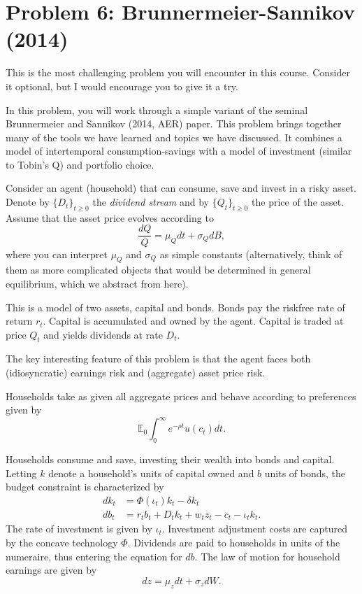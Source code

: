 \documentclass[11pt]{extarticle}
\theoremstyle{plain}
\theoremstyle{definition}
\begin{document}
\vspace{5mm}
\section*{Problem 6: Brunnermeier-Sannikov (2014)}


This is the most challenging problem you will encounter in this course. Consider it optional, but I would encourage you to give it a try. 


In this problem, you will work through a simple variant of the seminal Brunnermeier and Sannikov (2014, AER) paper. This problem brings together many of the tools we have learned and topics we have discussed. It combines a model of intertemporal consumption-savings with a model of investment (similar to Tobin's Q) and portfolio choice.


Consider an agent (household) that can consume, save and invest in a risky asset. Denote by $\{ D_t \}_{t \geq 0}$ the \textit{dividend stream} and by $\{ Q_t \}_{t \geq 0}$ the price of the asset. Assume that the asset price evolves according to 
\begin{equation*}
	\frac{ dQ }{Q} = \mu_Q dt + \sigma_Q dB,
\end{equation*}
where you can interpret $\mu_Q$ and $\sigma_Q$ as simple constants (alternatively, think of them as more complicated objects that would be determined in general equilibrium, which we abstract from here).


This is a model of two assets, capital and bonds. Bonds pay the riskfree rate of return $r_t$. Capital is accumulated and owned by the agent. Capital is traded at price $Q_t$ and yields dividends at rate $D_t$.

The key interesting feature of this problem is that the agent faces both (idiosyncratic) earnings risk and (aggregate) asset price risk.

Households take as given all aggregate prices and behave according to preferences given by
\begin{equation*}
	\mathbb{E}_0 \int_0^\infty e^{- \rho t} u(c_t) dt.
\end{equation*}

Households consume and save, investing their wealth into bonds and capital. Letting $k$ denote a household's units of capital owned and $b$ units of bonds, the budget constraint is characterized by
\begin{align*}
	dk_t &= \Phi(\iota_t) k_t - \delta k_t \\
	db_t &= r_t b_t + D_t k_t + w_t z_t - c_t -  \iota_t k_t.
\end{align*}
The rate of investment is given by $\iota_t$. Investment adjustment costs are captured by the concave technology $\Phi$. Dividends are paid to households in units of the numeraire, thus entering the equation for $db$. The law of motion for household earnings are given by
\begin{equation*}
	dz = \mu_z dt + \sigma_z dW. 
\end{equation*}
\end{document}
